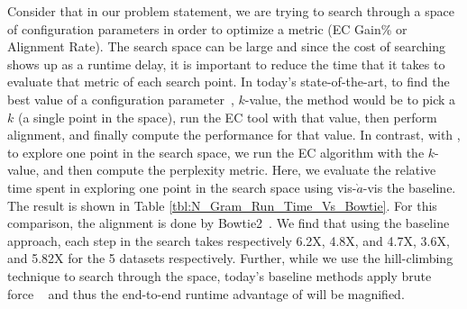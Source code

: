 Consider that in our problem statement, we are trying to search through a space of configuration parameters in order to optimize a metric (EC Gain\% or Alignment Rate). The search space can be large and since the cost of searching shows up as a runtime delay, it is important to reduce the time that it takes to evaluate that metric of each search point. In today's state-of-the-art, to find the best value of a configuration parameter~\cite{chikhi2013informed, mahadik2017scalable}, \eg $k$-value, the method would be to pick a $k$ (a single point in the space), run the EC tool with that value, then perform alignment, and finally compute the performance for that value. In contrast, with \name, to explore one point in the search space, we run the EC algorithm with the $k$-value, and then compute the perplexity metric. Here, we evaluate the relative time spent in exploring one point in the search space using \name vis-$\grave{a}$-vis the baseline. The result is shown in Table \ref{tbl:N_Gram_Run_Time_Vs_Bowtie}. For this comparison, the alignment is done by Bowtie2~\cite{langmead2012fast}. We find that using the baseline approach, each step in the search takes respectively 6.2X, 4.8X, and 4.7X, 3.6X, and 5.82X for the 5 datasets respectively. Further, while we use the hill-climbing technique to search through the space, today's baseline methods apply brute force ~\cite{song2014lighter} and thus the end-to-end runtime advantage of \name will be magnified. 


